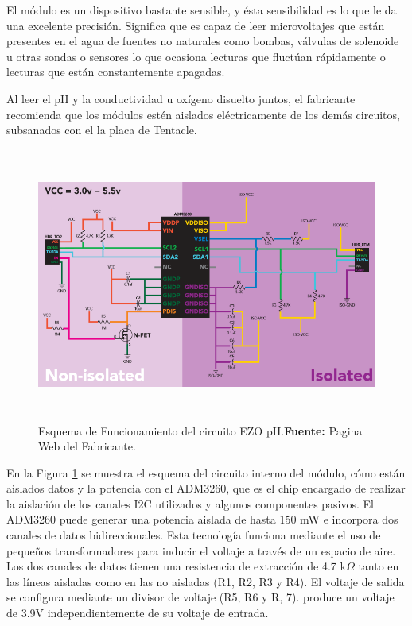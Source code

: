 El módulo es un dispositivo bastante sensible, y ésta sensibilidad es lo que le da una excelente precisión. Significa que es capaz de leer microvoltajes que están presentes en el agua de fuentes no naturales como bombas, válvulas de solenoide u otras sondas o sensores lo que ocasiona lecturas que fluctúan rápidamente o lecturas que están constantemente apagadas.

Al leer el pH y la conductividad u oxígeno disuelto juntos, el fabricante recomienda que los módulos estén aislados eléctricamente de los demás circuitos, subsanados con el la placa de Tentacle.
\newline
\hfill
\begin{figure}[t]
    \centering
    \includegraphics[width=150mm, height=90mm]{Imagenes/2021/imag36.png}
    \caption[Esquema de Funcionamiento del circuito EZO pH]{Esquema de Funcionamiento del circuito EZO pH.\textbf{Fuente: }Pagina Web del Fabricante\cite{ezoph}.}
    \label{fig:4.10}
\end{figure}
En la Figura \ref{fig:4.10} se muestra  el esquema del circuito interno del módulo, cómo están aislados datos y la potencia con el ADM3260, que es el chip encargado de realizar la aislación de los canales I2C utilizados y algunos componentes pasivos. El ADM3260 puede generar una potencia aislada de hasta 150 mW e incorpora dos canales de datos bidireccionales.
Esta tecnología funciona mediante el uso de pequeños transformadores para inducir el voltaje a través de un espacio de aire. Los dos canales de datos tienen una resistencia de extracción de 4.7 k$\Omega$ tanto en las líneas aisladas como en las no aisladas (R1, R2, R3 y R4). El voltaje de salida se configura mediante un divisor de voltaje (R5, R6 y R, 7). produce un voltaje de 3.9V independientemente de su voltaje de entrada.


